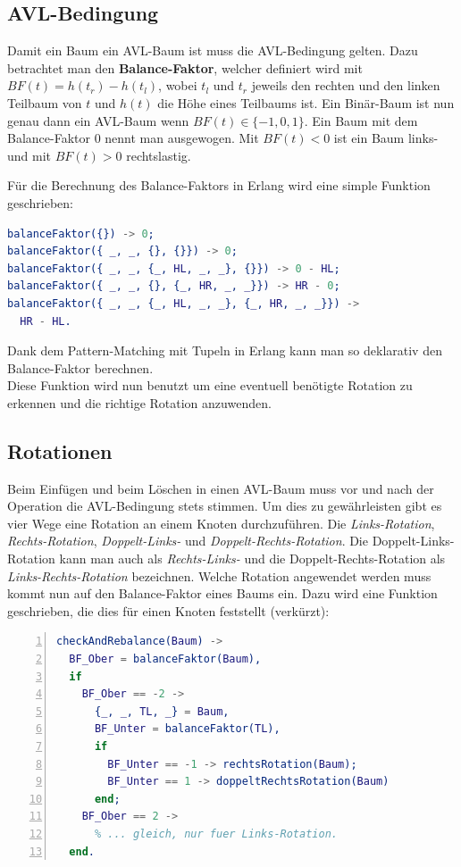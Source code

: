 \documentclass{article}
\begin{document}
	\subsection{AVL-Bedingung}
	\label{sec:avl-crit}

	Damit ein Baum ein AVL-Baum ist muss die AVL-Bedingung gelten. Dazu betrachtet man den \textbf{Balance-Faktor}, welcher definiert wird mit \\ $BF(t) = h(t_r) - h(t_l)$, wobei $t_l$ und $t_r$ jeweils den rechten und den linken Teilbaum von $t$ und $h(t)$ die Höhe eines Teilbaums ist.
	Ein Binär-Baum ist nun genau dann ein AVL-Baum wenn $BF(t) \in \{-1,0,1\}$. Ein Baum mit dem Balance-Faktor 0 nennt man ausgewogen. Mit $BF(t) < 0$ ist ein Baum links- und mit $BF(t) > 0$ rechtslastig.
	
	Für die Berechnung des Balance-Faktors in Erlang wird eine simple Funktion geschrieben:
	
	\begin{lstlisting}[language=erlang]
balanceFaktor({}) -> 0;
balanceFaktor({ _, _, {}, {}}) -> 0;
balanceFaktor({ _, _, {_, HL, _, _}, {}}) -> 0 - HL;
balanceFaktor({ _, _, {}, {_, HR, _, _}}) -> HR - 0;
balanceFaktor({ _, _, {_, HL, _, _}, {_, HR, _, _}}) -> 
  HR - HL.
	\end{lstlisting}
	
	Dank dem Pattern-Matching mit Tupeln in Erlang kann man so deklarativ den Balance-Faktor berechnen. \\
	Diese Funktion wird nun benutzt um eine eventuell benötigte Rotation zu erkennen und die richtige Rotation anzuwenden.
	
	\subsection{Rotationen}
	
	Beim Einfügen und beim Löschen in einen AVL-Baum muss vor und nach der Operation die AVL-Bedingung stets stimmen. Um dies zu gewährleisten gibt es vier Wege eine Rotation an einem Knoten durchzuführen. Die \textit{Links-Rotation}, \textit{Rechts-Rotation}, \textit{Doppelt-Links-} und \textit{Doppelt-Rechts-Rotation}. Die Doppelt-Links-Rotation kann man auch als \textit{Rechts-Links-} und die Doppelt-Rechts-Rotation als \textit{Links-Rechts-Rotation} bezeichnen. 
	Welche Rotation angewendet werden muss kommt nun auf den Balance-Faktor eines Baums ein. Dazu wird eine Funktion geschrieben, die dies für einen Knoten feststellt (verkürzt):
	
	\begin{lstlisting}[language=erlang,numbers=left]
checkAndRebalance(Baum) ->
  BF_Ober = balanceFaktor(Baum),
  if
    BF_Ober == -2 ->
	  {_, _, TL, _} = Baum,
	  BF_Unter = balanceFaktor(TL),
	  if
	    BF_Unter == -1 -> rechtsRotation(Baum);
	    BF_Unter == 1 -> doppeltRechtsRotation(Baum)
	  end;
	BF_Ober == 2 ->
	  % ... gleich, nur fuer Links-Rotation.
  end.	
	\end{lstlisting}
\end{document}

